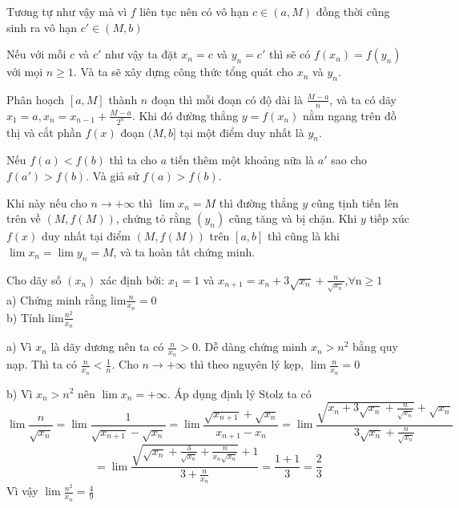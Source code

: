 \documentclass[11pt]{scrartcl}
\begin{document}
\begin{itemize}[label=, leftmargin=0em, itemsep=0.5em]
\begin{sol}
        
        Tương tự như vậy mà vì $f$ liên tục nên có vô hạn $c \in (a,M)$ đồng thời cũng sinh ra vô hạn $c' \in (M,b)$


        Nếu với mỗi $c$ và $c'$ như vậy ta đặt $x_n = c$ và $y_n = c'$ thì sẽ có $f(x_n) = f(y_n)$ với mọi $n \geq 1$. Và ta sẽ xây dựng công thức tổng quát cho $x_n$ và $y_n$.


        Phân hoạch $[a,M]$ thành $n$ đoạn thì mỗi đoạn có độ dài là $\frac{M - a}{n}$,  và ta có dãy $x_1 = a, x_n = x_{n - 1}+ \frac{M - a}{2^n} $. Khi đó đường thẳng $y = f(x_n)$ nằm ngang trên đồ thị và cắt phần $f(x)$ đoạn $(M,b]$ tại một điểm duy nhất là $y_n$.
        
        Nếu $f(a) < f(b)$ thì ta cho $a$ tiến thêm một khoảng nữa là $a'$ sao cho $f(a') > f(b)$. Và giả sử $f(a) > f(b)$.


        Khi này nếu cho $n \to +\infty$ thì $\lim x_n = M$ thì đường thẳng $y$ cũng tịnh tiến lên trên về $(M,f(M))$, chứng tỏ rằng $(y_n)$ cũng tăng và bị chặn. Khi $y$ tiếp xúc $f(x)$ duy nhất tại điểm $(M,f(M))$ trên $[a,b]$ thì cũng là khi $\lim x_n = \lim y_n = M$, và ta hoàn tất chứng minh.
    \end{sol}
    \begin{bt}
        Cho dãy số $(x_n)$ xác định bởi: $x_1=1$ và $x_{n+1}=x_n+3\sqrt{x_n} + \frac{n}{\sqrt{x_n}}$,$\forall$n$\ge1$\\
a) Chứng minh rằng lim$\frac{n}{x_n}=0$\\ 
b) Tính lim$\frac{n^2}{x_n}$
    \end{bt}


    \begin{sol}
        a) Vì $x_n$ là dãy dương nên ta có $\frac{n}{x_n} > 0$. Dễ dàng chứng minh $x_n > n^2$ bằng quy nạp. Thì ta có $\frac{n}{x_n} < \frac{1}{n}$. Cho $n \to +\infty$ thì theo nguyên lý kẹp, $\lim\frac{n}{x_n} = 0$ 


        b) Vì $x_n > n^2$ nên $\lim x_n = +\infty$. Áp dụng định lý Stolz ta có 
        \[\lim \frac{n}{\sqrt{x_n}} =\lim \frac{1}{\sqrt{x_{n + 1}} - \sqrt{x_n}} = \lim \frac{\sqrt{x_{n+1}} + \sqrt{x_n}}{x_{n + 1} - x_n} = \lim \frac{\sqrt{x_n + 3\sqrt{x_n} + \frac{n}{\sqrt{x_n}}}+ \sqrt{x_n}}{3\sqrt{x_n} + \frac{n}{\sqrt{x_n}}} \]
        \[
            = \lim \frac{\sqrt{\sqrt{x_n} + \frac{3}{\sqrt{x_n}} + \frac{n}{x_n\sqrt{x_n}}}+ 1}{3 + \frac{n}{x_n}} = \frac{1 + 1}{3} = \frac{2}{3}
        \]
        Vì vậy $\lim\frac{n^2}{x_n} = \frac{4}{9}$
    \end{sol}


\end{itemize}
\end{document}
